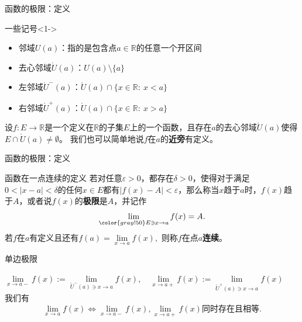 \begin{frame}{函数的极限：定义}

\begin{block}{一些记号}<1->
\begin{itemize}
\item 邻域$U(a)$：指的是包含点$a\in\mathbb{R}$的任意一个开区间
\item 去心邻域$\mathring{U}(a)$：$U(a)\setminus \{a\}$
\item 左邻域$\mathring{U}^-(a)$：$\mathring{U}(a)\cap \{x\in\mathbb{R}: \ x < a\}$
\item 右邻域$\mathring{U}^+(a)$：$\mathring{U}(a)\cap \{x\in\mathbb{R}: \ x > a\}$
\end{itemize}
\end{block}

\pause

设$f:E\to\mathbb{R}$是一个定义在$\mathbb{R}$的子集$E$上的一个函数，且存在$a$的去心邻域$\mathring{U}(a)$使得$E\cap\mathring{U}(a)\neq\emptyset$。\newline
我们也可以简单地说$f$在$a$的{\bfseries 近旁}有定义。

\end{frame}


\begin{frame}{函数的极限：定义}

\begin{block}{函数在一点连续的定义}
若对任意$\varepsilon > 0$，都存在$\delta > 0$，使得对于满足$0 < |x-a| < \delta$的任何$x\in E$都有$|f(x)-A| < \varepsilon$，那么称当$x$趋于$a$时，$f(x)$趋于$A$，或者说$f(x)$的{\bfseries 极限}是$A$，并记作
\[\lim\limits_{{\color{gray!50} E\ni}x\to a}f(x) = A.\]
若$f$在$a$有定义且还有$f(a) = \lim\limits_{x\to a}f(x),$ 则称$f$在点$a${\bfseries 连续}。
\end{block}

\pause

\begin{block}{单边极限}
\begin{center}
\(\displaystyle \lim\limits_{x\to a-}f(x) := \lim\limits_{\mathring{U}^-(a) \ni x\to a}f(x), \quad \lim\limits_{x\to a+}f(x) := \lim\limits_{\mathring{U}^+(a) \ni x\to a}f(x)\) \\
\pause
我们有
\[\lim\limits_{x\to a}f(x) \Longleftrightarrow \lim\limits_{x\to a-}f(x),\lim\limits_{x\to a+}f(x) \text{同时存在且相等}.\]
\end{center}
\end{block}

\end{frame}


